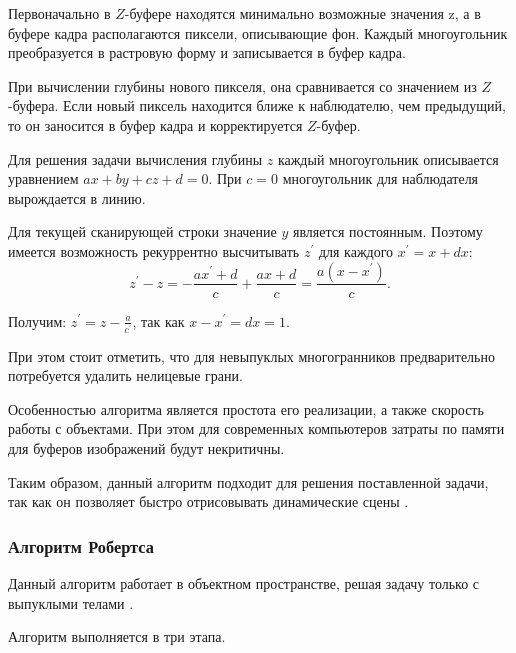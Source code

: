 Первоначально в $Z$-буфере находятся минимально возможные значения z, а в буфере кадра располагаются пиксели, описывающие фон. Каждый многоугольник преобразуется в растровую форму и записывается в буфер кадра.

При вычислении глубины нового пикселя, она сравнивается со значением из $Z$-буфера. Если новый пиксель находится ближе к наблюдателю, чем предыдущий, то он заносится в буфер кадра и корректируется $Z$-буфер.

Для решения задачи вычисления глубины $z$ каждый многоугольник описывается уравнением $ax + by + cz + d = 0$. При $c = 0$ многоугольник для наблюдателя вырождается в линию. 

Для текущей сканирующей строки значение $y$ является постоянным. Поэтому имеется возможность рекуррентно высчитывать $z^\prime$ для каждого $x^\prime = x + dx$:
\begin{equation}
	z^\prime - z = -\frac{ax^\prime + d}{c} +\frac{ax + d}{c} = \frac{a(x - x^\prime)}{c}.
\end{equation}

Получим: $z^\prime = z - \frac{a}{c^\prime}$, так как $x - x^\prime = dx = 1$.

При этом стоит отметить, что для невыпуклых многогранников предварительно потребуется удалить нелицевые грани.

Особенностью алгоритма является простота его реализации, а также скорость работы с объектами. При этом для современных компьютеров затраты по памяти для буферов изображений будут некритичны.

Таким образом, данный алгоритм подходит для решения поставленной задачи, так как он позволяет быстро отрисовывать динамические сцены \cite{rogers}.

\subsubsection{Алгоритм Робертса}

Данный алгоритм работает в объектном пространстве, решая задачу только с выпуклыми телами \cite{robert}.

Алгоритм выполняется в три этапа.

